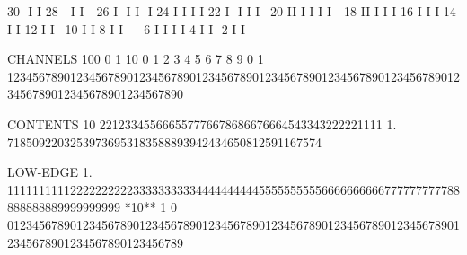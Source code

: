 \begin{Listing}
       30                                                             -I                             I
       28                                                         -   I                              I  -
       26                                                         I  -I                              I- I
       24                                                         I  I                                I I
       22                                                         I- I                                I I--
       20                                                         II I                                I-I I -
       18                                                         II-I                                    I I
       16                                                         I                                       I-I
       14                                                         I                                         I
       12                                                         I                                         I--
       10                                                         I                                           I
        8                                                         I                                           I - -
        6                                                         I                                           I-I-I
        4                                                         I                                               I-
        2                                                         I                                                I
 
 CHANNELS 100   0                                                                                                  1   
           10   0        1         2         3         4         5         6         7         8         9         0   
            1   1234567890123456789012345678901234567890123456789012345678901234567890123456789012345678901234567890   
 
 CONTENTS  10                                                     221233455666557776678686676664543343222221111     
            1.                                                    71850922032539736953183588893942434650812591167574
 
 LOW-EDGE   1.            111111111122222222223333333333444444444455555555556666666666777777777788888888889999999999
 *10**  1   0   0123456789012345678901234567890123456789012345678901234567890123456789012345678901234567890123456789
 

\end{Listing}
